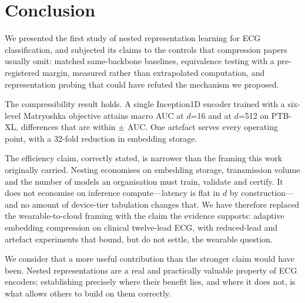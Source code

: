 \section{Conclusion}

We presented the first study of nested representation learning for ECG
classification, and subjected its claims to the controls that compression
papers usually omit: matched same-backbone baselines, equivalence testing with
a pre-registered margin, measured rather than extrapolated computation, and
representation probing that could have refuted the mechanism we proposed.

The compressibility result holds. A single Inception1D encoder trained with a
six-level Matryoshka objective attains  macro AUC at $d$=16 and
 at $d$=512 on PTB-XL, differences that are 
within $\pm$ AUC. One artefact serves every operating point,
with a 32-fold reduction in embedding storage.

The efficiency claim, correctly stated, is narrower than the framing this work
originally carried. Nesting economises on embedding storage, transmission
volume and the number of models an organisation must train, validate and
certify. It does not economise on inference compute---latency is flat in $d$
by construction---and no amount of device-tier tabulation changes that. We
have therefore replaced the wearable-to-cloud framing with the claim the
evidence supports: adaptive embedding compression on clinical twelve-lead ECG,
with reduced-lead and artefact experiments that bound, but do not settle, the
wearable question.

We consider that a more useful contribution than the stronger claim would have
been. Nested representations are a real and practically valuable property of
ECG encoders; establishing precisely where their benefit lies, and where it
does not, is what allows others to build on them correctly.
